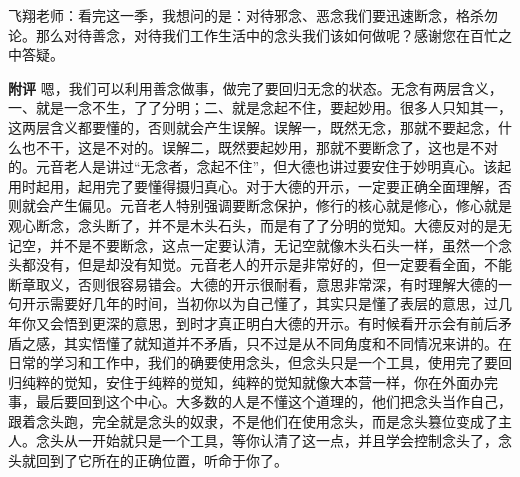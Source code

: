 \begin{case}
    飞翔老师：看完这一季，我想问的是：对待邪念、恶念我们要迅速断念，格杀勿论。那么对待善念，对待我们工作生活中的念头我们该如何做呢？感谢您在百忙之中答疑。

    \textbf{附评} 嗯，我们可以利用善念做事，做完了要回归无念的状态。无念有两层含义，一、就是一念不生，了了分明；二、就是念起不住，要起妙用。很多人只知其一，这两层含义都要懂的，否则就会产生误解。误解一，既然无念，那就不要起念，什么也不干，这是不对的。误解二，既然要起妙用，那就不要断念了，这也是不对的。元音老人是讲过“无念者，念起不住”，但大德也讲过要安住于妙明真心。该起用时起用，起用完了要懂得摄归真心。对于大德的开示，一定要正确全面理解，否则就会产生偏见。元音老人特别强调要断念保护，修行的核心就是修心，修心就是观心断念，念头断了，并不是木头石头，而是有了了分明的觉知。大德反对的是无记空，并不是不要断念，这点一定要认清，无记空就像木头石头一样，虽然一个念头都没有，但是却没有知觉。元音老人的开示是非常好的，但一定要看全面，不能断章取义，否则很容易错会。大德的开示很耐看，意思非常深，有时理解大德的一句开示需要好几年的时间，当初你以为自己懂了，其实只是懂了表层的意思，过几年你又会悟到更深的意思，到时才真正明白大德的开示。有时候看开示会有前后矛盾之感，其实悟懂了就知道并不矛盾，只不过是从不同角度和不同情况来讲的。在日常的学习和工作中，我们的确要使用念头，但念头只是一个工具，使用完了要回归纯粹的觉知，安住于纯粹的觉知，纯粹的觉知就像大本营一样，你在外面办完事，最后要回到这个中心。大多数的人是不懂这个道理的，他们把念头当作自己，跟着念头跑，完全就是念头的奴隶，不是他们在使用念头，而是念头篡位变成了主人。念头从一开始就只是一个工具，等你认清了这一点，并且学会控制念头了，念头就回到了它所在的正确位置，听命于你了。
\end{case}

